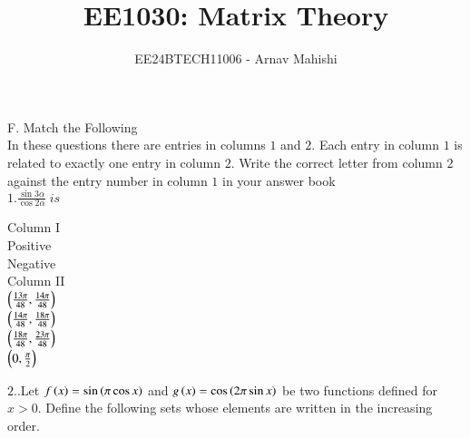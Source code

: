 \documentclass[journal,12pt,twocolumn]{IEEEtran}
\theoremstyle{remark}
\begin{document}

\vspace{3cm}

\title{EE1030: Matrix Theory}
\author{EE24BTECH11006 - Arnav Mahishi}
\maketitle
\newpage
\bigskip

\renewcommand{\thefigure}{\theenumi}
\renewcommand{\thetable}{\theenumi}
F. Match the Following \\
In these questions there are entries in columns $1$ and $2$. Each entry in column $1$ is related to exactly one entry in column $2$. Write the correct letter from column $2$ against the entry number in column $1$ in your answer book
\\
$1. \frac{\sin3\alpha}{\cos2\alpha} \; is $\hfill{}
\\
\begin{multicols}{2}
Column I
\\
 Positive
\\
 Negative
\columnbreak
\\
Column II
\\
 $\left(\frac{13\pi}{48},\frac{14\pi}{48}\right)$
\\
 $\left(\frac{14\pi}{48},\frac{18\pi}{48}\right)$
\\
 $\left(\frac{18\pi}{48},\frac{23\pi}{48}\right)$
\\
 $\left(0,\frac{\pi}{2}\right)$


\end{multicols}


$2.$.Let $f\left(x\right) = \sin\left(\pi \cos x\right)$ and $g\left(x\right) = \cos\left(2\pi \sin x\right)$ be two functions defined for $x > 0$. Define the following sets whose elements are written in the increasing order. \hfill{}
 
\end{document}
